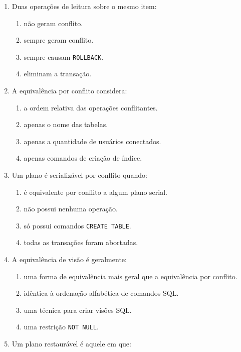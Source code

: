 \documentclass[12pt,a4paper]{article}
\begin{document}
\begin{enumerate}[label=\textbf{Q\arabic*.}]
\item Duas operações de leitura sobre o mesmo item:

\begin{enumerate}[label=\alph*)]
    \item não geram conflito.
    \item sempre geram conflito.
    \item sempre causam \texttt{ROLLBACK}.
    \item eliminam a transação.
\end{enumerate}

\item A equivalência por conflito considera:

\begin{enumerate}[label=\alph*)]
    \item a ordem relativa das operações conflitantes.
    \item apenas o nome das tabelas.
    \item apenas a quantidade de usuários conectados.
    \item apenas comandos de criação de índice.
\end{enumerate}

\item Um plano é serializável por conflito quando:

\begin{enumerate}[label=\alph*)]
    \item é equivalente por conflito a algum plano serial.
    \item não possui nenhuma operação.
    \item só possui comandos \texttt{CREATE TABLE}.
    \item todas as transações foram abortadas.
\end{enumerate}

\item A equivalência de visão é geralmente:

\begin{enumerate}[label=\alph*)]
    \item uma forma de equivalência mais geral que a equivalência por conflito.
    \item idêntica à ordenação alfabética de comandos SQL.
    \item uma técnica para criar visões SQL.
    \item uma restrição \texttt{NOT NULL}.
\end{enumerate}

\item Um plano restaurável é aquele em que:


\end{enumerate}
\end{document}
